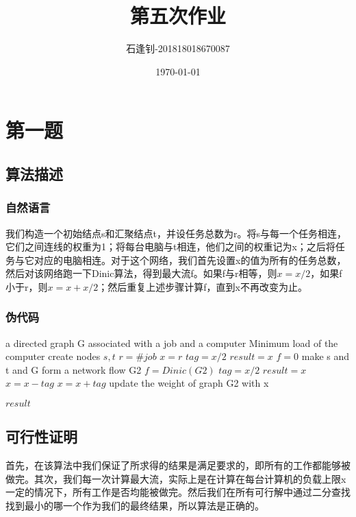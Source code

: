 \documentclass{article}
\title{第五次作业}
\author{石逢钊-201818018670087}
\date{\today}
\begin{document}
	\maketitle
	\section{第一题}
		
		\subsection{算法描述}
			\subsubsection{自然语言}
			我们构造一个初始结点s和汇聚结点t，并设任务总数为r。将s与每一个任务相连，它们之间连线的权重为1；将每台电脑与t相连，他们之间的权重记为x；之后将任务与它对应的电脑相连。对于这个网络，我们首先设置x的值为所有的任务总数，然后对该网络跑一下Dinic算法，得到最大流f。如果f与r相等，则$x=x/2$，如果f小于r，则$x=x+x/2$；然后重复上述步骤计算f，直到x不再改变为止。
			\subsubsection{伪代码}
			\begin{algorithm}
				\begin{algorithmic}[1]
					\Require a directed graph G associated with a job and a computer
					\Ensure Minimum load of the computer
						\State create nodes $s,t$
						\State $r=\#job$
						\State $x=r$
						\State $tag=x/2$
						\State $result=x$
						\State $f=0$
						\State make s and t and G form a network flow G2
							\State $f=Dinic(G2)$
							\State $tag=x/2$
								\State $result=x$
								\State $x=x-tag$
							\Else
								\State $x=x+tag$
							\EndIf
							\State update the weight of graph G2 with x
						\EndWhile
						
						\Return $result$
					\EndFunction	
				\end{algorithmic}
			\end{algorithm}
		
		\vspace{5cm}
		\subsection{可行性证明}
		首先，在该算法中我们保证了所求得的结果是满足要求的，即所有的工作都能够被做完。其次，我们每一次计算最大流，实际上是在计算在每台计算机的负载上限x一定的情况下，所有工作是否均能被做完。然后我们在所有可行解中通过二分查找找到最小的哪一个作为我们的最终结果，所以算法是正确的。
\end{document}
